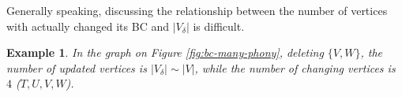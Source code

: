 \documentclass[twocolumn]{article}
\newtheorem{example}{Example}
\begin{document}
  Generally speaking, discussing the relationship between the number of vertices with actually changed its BC and $\lvert V_\delta\rvert$ is difficult.

  \begin{example}
    In the graph on Figure \ref{fig:bc-many-phony}, deleting $\{V,W\}$, the number of updated vertices is $\lvert V_\delta\rvert\sim \lvert V\rvert$, while the number of changing vertices is $4$ ($T,U,V,W$).
        
    \begin{figure*}[tb]
      \centering
      \def\svgwidth{.8\linewidth}
      
      \caption{Example with many unnecessary updates.}
      \label{fig:bc-many-phony}
    \end{figure*}
  \end{example}
\end{document}
